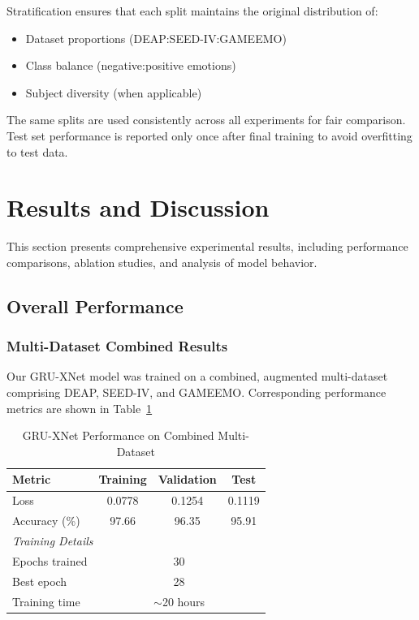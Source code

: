 \documentclass[conference]{IEEEtran}
\begin{document}
Stratification ensures that each split maintains the original distribution of:
\begin{itemize}
    \item Dataset proportions (DEAP:SEED-IV:GAMEEMO)
    \item Class balance (negative:positive emotions)
    \item Subject diversity (when applicable)
\end{itemize}

The same splits are used consistently across all experiments for fair comparison. Test set performance is reported only once after final training to avoid overfitting to test data.


\section{Results and Discussion}
\label{sec:results}


This section presents comprehensive experimental results, including performance comparisons, ablation studies, and analysis of model behavior.

\subsection{Overall Performance}

\subsubsection{Multi-Dataset Combined Results}

Our GRU-XNet model was trained on a combined, augmented multi-dataset comprising DEAP, SEED-IV, and GAMEEMO. Corresponding performance metrics are shown in Table~\ref{tab:overall_results}


\begin{table}[!htbp]
\centering
\caption{GRU-XNet Performance on Combined Multi-Dataset}
\label{tab:overall_results}
\begin{tabular}{lccc}
\toprule
\textbf{Metric} & \textbf{Training} & \textbf{Validation} & \textbf{Test} \\
\midrule
Loss & 0.0778 & 0.1254 & 0.1119 \\
Accuracy (\%) & 97.66 & 96.35 & 95.91 \\
\midrule
\multicolumn{4}{l}{\textit{Training Details}} \\
Epochs trained & \multicolumn{3}{c}{30} \\
Best epoch & \multicolumn{3}{c}{28} \\
Training time & \multicolumn{3}{c}{$\sim$20 hours} \\
\bottomrule
\end{tabular}
\end{table}
\end{document}

